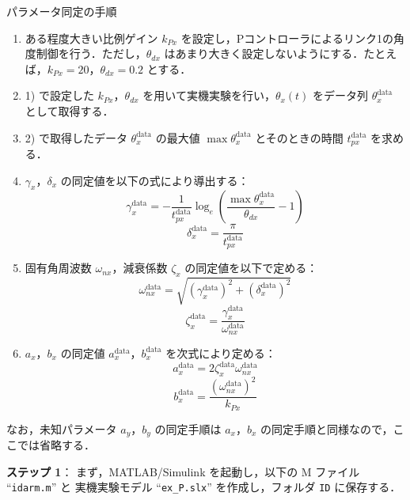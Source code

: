 パラメータ同定の手順
    \begin{enumerate}
        \item ある程度大きい比例ゲイン $k_{Px}$ を設定し，Pコントローラによるリンク1の角度制御を行う．ただし，$\theta_{dx}$ はあまり大きく設定しないようにする．たとえば，$k_{Px} = 20$，$\theta_{dx} = 0.2$ とする．
    
        \item 1) で設定した $k_{Px}$，$\theta_{dx}$ を用いて実機実験を行い，$\theta_x(t)$ をデータ列 $\theta_x^{\mathrm{data}}$ として取得する．
    
        \item 2) で取得したデータ $\theta_x^{\mathrm{data}}$ の最大値 $\max \theta_x^{\mathrm{data}}$ とそのときの時間 $t_{px}^{\mathrm{data}}$ を求める．
    
        \item $\gamma_x$，$\delta_x$ の同定値を以下の式により導出する：
        \[
            \gamma_x^{\mathrm{data}} = -\frac{1}{t_{px}^{\mathrm{data}}} \log_e \left( \frac{\max \theta_x^{\mathrm{data}}}{\theta_{dx}} - 1 \right) \tag{4.8}
        \]
        \[
            \delta_x^{\mathrm{data}} = \frac{\pi}{t_{px}^{\mathrm{data}}} \tag{4.9}
        \]
    
        \item 固有角周波数 $\omega_{nx}$，減衰係数 $\zeta_x$ の同定値を以下で定める：
        \[
            \omega_{nx}^{\mathrm{data}} = \sqrt{ (\gamma_x^{\mathrm{data}})^2 + (\delta_x^{\mathrm{data}})^2 } \tag{4.10}
        \]
        \[
            \zeta_x^{\mathrm{data}} = \frac{\gamma_x^{\mathrm{data}}}{\omega_{nx}^{\mathrm{data}}} \tag{4.11}
        \]
    
        \item $a_x$，$b_x$ の同定値 $a_x^{\mathrm{data}}$，$b_x^{\mathrm{data}}$ を次式により定める：
        \[
            a_x^{\mathrm{data}} = 2 \zeta_x^{\mathrm{data}} \omega_{nx}^{\mathrm{data}} \tag{4.12}
        \]
        \[
            b_x^{\mathrm{data}} = \frac{(\omega_{nx}^{\mathrm{data}})^2}{k_{Px}} \tag{4.13}
        \]
    \end{enumerate}
    
なお，未知パラメータ $a_y$，$b_y$ の同定手順は $a_x$，$b_x$ の同定手順と同様なので，ここでは省略する．

\noindent
\textbf{ステップ 1}：
まず，MATLAB/Simulink を起動し，以下の M ファイル ``\texttt{idarm.m}'' と
実機実験モデル ``\texttt{ex\_P.slx}'' を作成し，フォルダ \texttt{\textyen ID} に保存する．

